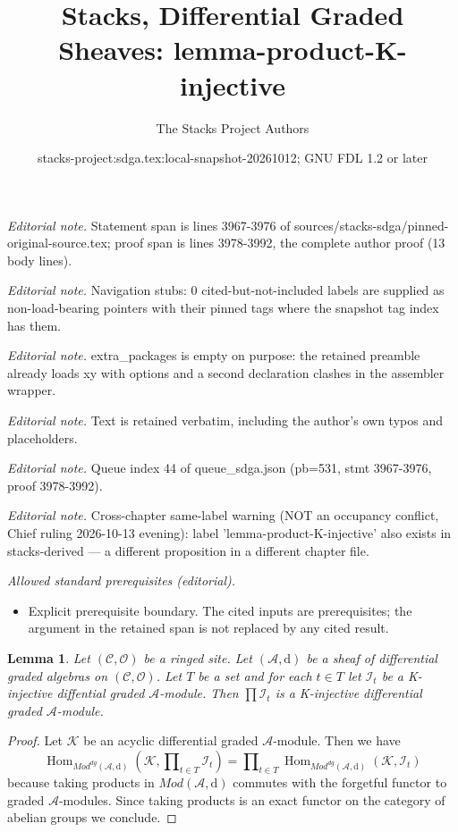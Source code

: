 \documentclass[10pt,a4paper]{amsart}
\title{Stacks, Differential Graded Sheaves: lemma-product-K-injective}
\author{The Stacks Project Authors}
\date{stacks-project:sdga.tex:local-snapshot-20261012; GNU FDL 1.2 or later}
\theoremstyle{plain}
\newtheorem{lemma}[subsection]{Lemma}
\theoremstyle{definition}
\theoremstyle{remark}
\numberwithin{equation}{subsection}
\def\Hom{\mathop{\mathrm{Hom}}\nolimits}
\begin{document}
\maketitle
\noindent\textit{Editorial note.} Statement span is lines 3967-3976 of sources/stacks-sdga/pinned-original-source.tex; proof span is lines 3978-3992, the complete author proof (13 body lines).\par\medskip
\noindent\textit{Editorial note.} Navigation stubs: 0 cited-but-not-included labels are supplied as non-load-bearing pointers with their pinned tags where the snapshot tag index has them.\par\medskip
\noindent\textit{Editorial note.} extra\_packages is empty on purpose: the retained preamble already loads xy with options and a second declaration clashes in the assembler wrapper.\par\medskip
\noindent\textit{Editorial note.} Text is retained verbatim, including the author's own typos and placeholders.\par\medskip
\noindent\textit{Editorial note.} Queue index 44 of queue\_sdga.json (pb=531, stmt 3967-3976, proof 3978-3992).\par\medskip
\noindent\textit{Editorial note.} Cross-chapter same-label warning (NOT an occupancy conflict, Chief ruling 2026-10-13 evening): label 'lemma-product-K-injective' also exists in stacks-derived — a different proposition in a different chapter file.\par\medskip
\noindent\textit{Allowed standard prerequisites (editorial).}\begin{itemize}
\item Explicit prerequisite boundary. The cited inputs are prerequisites; the argument in the retained span is not replaced by any cited result.
\end{itemize}\medskip
\begin{lemma}
\label{lemma-product-K-injective}
Let $(\mathcal{C}, \mathcal{O})$ be a ringed site.
Let $(\mathcal{A}, \text{d})$ be a sheaf of differential graded algebras
on $(\mathcal{C}, \mathcal{O})$. Let $T$ be a set and for
each $t \in T$ let $\mathcal{I}_t$ be a K-injective
diffential graded $\mathcal{A}$-module. Then
$\prod \mathcal{I}_t$ is a K-injective differential
graded $\mathcal{A}$-module.
\end{lemma}

\begin{proof}
Let $\mathcal{K}$ be an acyclic differential graded $\mathcal{A}$-module.
Then we have
$$
\Hom_{\textit{Mod}^{dg}(\mathcal{A}, \text{d})}(\mathcal{K},
\prod\nolimits_{t \in T} \mathcal{I}_t)
=
\prod\nolimits_{t \in T}
\Hom_{\textit{Mod}^{dg}(\mathcal{A}, \text{d})}(\mathcal{K}, \mathcal{I}_t)
$$
because taking products in $\textit{Mod}(\mathcal{A}, \text{d})$
commutes with the forgetful functor to graded $\mathcal{A}$-modules.
Since taking products is an exact functor on the category of abelian groups
we conclude.
\end{proof}
\end{document}
